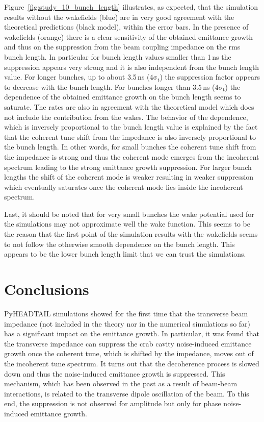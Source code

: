  Figure~\ref{fig:study_10_bunch_length} illustrates, as expected, that the simulation results without the wakefields (blue) are in very good agreement with the theoretical predictions (black model), within the error bars. In the presence of wakefields (orange) there is a clear sensitivity of the obtained emittance growth and thus on the suppression from the beam coupling impedance on the rms bunch length. In particular for bunch length values smaller than 1\,ns the suppression appears very strong and it is also independent from the bunch length value. For longer bunches, up to about 3.5\,ns ($\mathrm{4 \sigma_t}$) the suppression factor appears to decrease with the bunch length. For bunches longer than 3.5\,ns ($\mathrm{4 \sigma_t}$) the dependence of the obtained emittance growth on the bunch length seems to saturate. The rates are also in agreement with the theoretical model which does not include the contribution from the wakes. The behavior of the dependence, which is inversely proportional to the bunch length value is explained by the fact that the coherent tune shift from the impedance is also inversely proportional to the bunch length. In other words, for small bunches the coherent tune shift from the impedance is strong and thus the coherent mode emerges from the incoherent spectrum leading to the strong emittance growth suppression. For larger bunch lengths the shift of the coherent mode is weaker resulting in weaker suppression which eventually saturates once the coherent mode lies inside the incoherent spectrum.

 Last, it should be noted that for very small bunches the wake potential used for the simulations may not approximate well the wake function. This seems to be the reason that the first point of the simulation results with the wakefields seems to not follow the otherwise smooth dependence on the bunch length. This appears to be the lower bunch length limit that we can trust the simulations.




\section{Conclusions}\label{sec:Ch7_conclusions}
PyHEADTAIL simulations showed for the first time that the transverse beam impedance (not included in the theory nor in the numerical simulations so far) has a significant impact on the emittance growth. In particular, it was found that the transverse impedance can suppress the crab cavity noise-induced emittance growth once the coherent tune, which is shifted by the impedance, moves out of the incoherent tune spectrum. It turns out that the decoherence process is slowed down and thus the noise-induced emittance growth is suppressed. This mechanism, which has been observed in the past as a result of beam-beam interactions, is related to the transverse dipole oscillation of the beam. To this end, the suppression is not observed for amplitude but only for phase noise-induced emittance growth.

